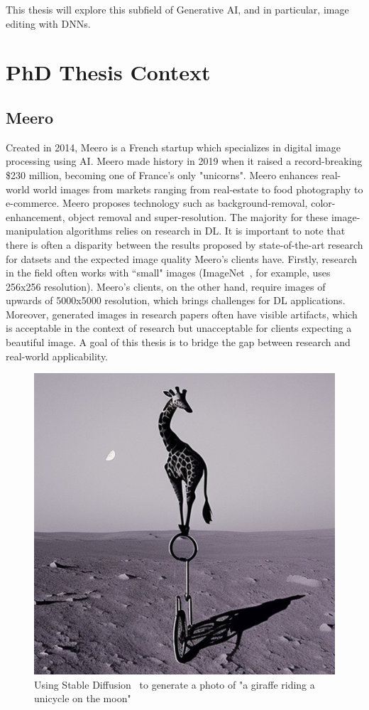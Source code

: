 This thesis will explore this subfield of Generative \ac{AI}, and in particular, image editing with \ac{DNN}s.


\section{PhD Thesis Context}

\subsection{Meero}
Created in 2014, Meero is a French startup which specializes in digital image processing using \ac{AI}. Meero made history in 2019 when 
it raised a record-breaking \$230 million, becoming one of France's only "unicorns". Meero enhances real-world world images from markets
ranging from real-estate to food photography to e-commerce. Meero proposes technology such as background-removal, color-enhancement, object 
removal and super-resolution. The majority for these image-manipulation algorithms relies on research in \ac{DL}.
It is important to note that there is often a disparity between the results proposed by state-of-the-art research for 
datsets and the expected image quality Meero's clients have. Firstly, research in the field often works with ``small" images 
(ImageNet~\citep{deng2009imagenet}, for example, uses 256x256 resolution). Meero's clients, on the other hand, require images of upwards of 5000x5000 resolution, 
which brings challenges for \ac{DL} applications.  Moreover, generated images in research papers often have 
visible artifacts, which is acceptable in the context of research but unacceptable for clients expecting a beautiful 
image. A goal of this thesis is to bridge the gap between research and real-world applicability.

\begin{figure}[tb]
    \begin{center}
        \includegraphics[width=0.5\linewidth]{images/intro/giraffe.png}
    \end{center}
    \caption{Using Stable Diffusion~\citep{rombach2022high} to generate a photo of "a giraffe riding a unicycle on the moon"}
    \label{fig:diffusion_example}
\end{figure}



